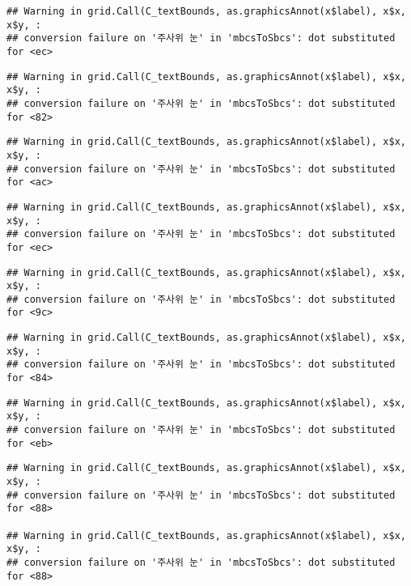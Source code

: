 \documentclass[]{book}
\begin{document}
\begin{verbatim}
## Warning in grid.Call(C_textBounds, as.graphicsAnnot(x$label), x$x, x$y, :
## conversion failure on '주사위 눈' in 'mbcsToSbcs': dot substituted for <ec>
\end{verbatim}

\begin{verbatim}
## Warning in grid.Call(C_textBounds, as.graphicsAnnot(x$label), x$x, x$y, :
## conversion failure on '주사위 눈' in 'mbcsToSbcs': dot substituted for <82>
\end{verbatim}

\begin{verbatim}
## Warning in grid.Call(C_textBounds, as.graphicsAnnot(x$label), x$x, x$y, :
## conversion failure on '주사위 눈' in 'mbcsToSbcs': dot substituted for <ac>
\end{verbatim}

\begin{verbatim}
## Warning in grid.Call(C_textBounds, as.graphicsAnnot(x$label), x$x, x$y, :
## conversion failure on '주사위 눈' in 'mbcsToSbcs': dot substituted for <ec>
\end{verbatim}

\begin{verbatim}
## Warning in grid.Call(C_textBounds, as.graphicsAnnot(x$label), x$x, x$y, :
## conversion failure on '주사위 눈' in 'mbcsToSbcs': dot substituted for <9c>
\end{verbatim}

\begin{verbatim}
## Warning in grid.Call(C_textBounds, as.graphicsAnnot(x$label), x$x, x$y, :
## conversion failure on '주사위 눈' in 'mbcsToSbcs': dot substituted for <84>
\end{verbatim}

\begin{verbatim}
## Warning in grid.Call(C_textBounds, as.graphicsAnnot(x$label), x$x, x$y, :
## conversion failure on '주사위 눈' in 'mbcsToSbcs': dot substituted for <eb>
\end{verbatim}

\begin{verbatim}
## Warning in grid.Call(C_textBounds, as.graphicsAnnot(x$label), x$x, x$y, :
## conversion failure on '주사위 눈' in 'mbcsToSbcs': dot substituted for <88>

## Warning in grid.Call(C_textBounds, as.graphicsAnnot(x$label), x$x, x$y, :
## conversion failure on '주사위 눈' in 'mbcsToSbcs': dot substituted for <88>
\end{verbatim}
\end{document}
